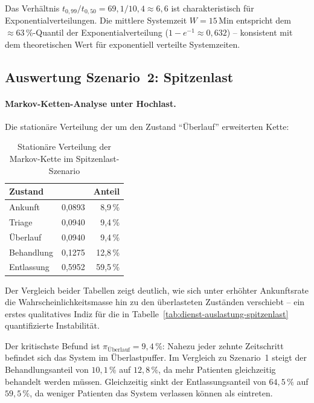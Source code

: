 ﻿\documentclass[a4paper,12pt]{report}
\theoremstyle{definition}
\begin{document}
Das Verhältnis $t_{0{,}99}/t_{0{,}50} = 69{,}1/10{,}4 \approx 6{,}6$ ist
charakteristisch für Exponentialverteilungen. Die mittlere Systemzeit
$W = 15$\,Min entspricht dem $\approx 63$\,\%-Quantil der Exponentialverteilung
($1 - e^{-1} \approx 0{,}632$) -- konsistent mit dem theoretischen Wert für
exponentiell verteilte Systemzeiten.

\subsection{Auswertung Szenario~2: Spitzenlast}

\paragraph{Markov-Ketten-Analyse unter Hochlast.}
Die stationäre Verteilung der um den Zustand ``Überlauf'' erweiterten Kette:

\begin{table}[H]
	\centering
	\begin{tabular}{@{}lrr@{}}
		\toprule
		\textbf{Zustand} & \boldmath{$\pi_i$} & \textbf{Anteil} \\
		\midrule
		Ankunft     & 0{,}0893 &  8{,}9\,\% \\
		Triage      & 0{,}0940 &  9{,}4\,\% \\
		Überlauf    & 0{,}0940 &  9{,}4\,\% \\
		Behandlung  & 0{,}1275 & 12{,}8\,\% \\
		Entlassung  & 0{,}5952 & 59{,}5\,\% \\
		\bottomrule
	\end{tabular}
	\caption{Stationäre Verteilung der Markov-Kette im Spitzenlast-Szenario}
\label{tab:stationaer-spitzenlast}
	\label{tab:pi-hochlast}
\end{table}

Der Vergleich beider Tabellen zeigt deutlich, wie sich unter erhöhter Ankunftsrate die Wahrscheinlichkeitsmasse hin zu den überlasteten Zuständen verschiebt -- ein erstes qualitatives Indiz für die in Tabelle~\ref{tab:dienst-auslastung-spitzenlast} quantifizierte Instabilität.

Der kritischste Befund ist $\pi_\text{Überlauf} = 9{,}4\,\%$: Nahezu jeder
zehnte Zeitschritt befindet sich das System im Überlastpuffer. Im Vergleich
zu Szenario~1 steigt der Behandlungsanteil von $10{,}1\,\%$ auf $12{,}8\,\%$,
da mehr Patienten gleichzeitig behandelt werden müssen. Gleichzeitig sinkt
der Entlassungsanteil von $64{,}5\,\%$ auf $59{,}5\,\%$, da weniger Patienten
das System verlassen können als eintreten.
\end{document}
